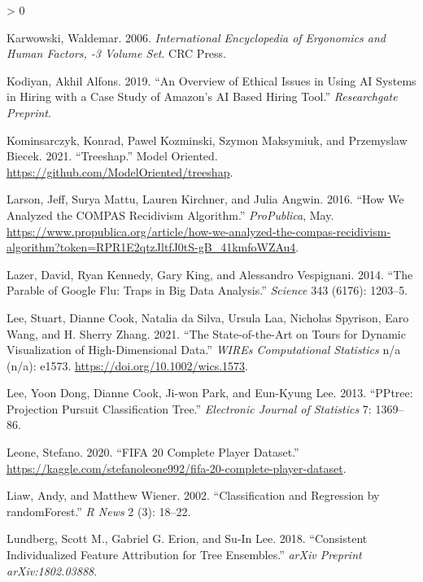\documentclass[
  article]{article}
\newlength{\cslhangindent}
\newenvironment{CSLReferences}[2] %
 {%
  \setlength{\parindent}{0pt}
  \ifodd #1 \everypar{\setlength{\hangindent}{\cslhangindent}}\ignorespaces\fi
  \ifnum #2 > 0
  \setlength{\parskip}{#2\baselineskip}
  \fi
 }%
 {}
\begin{document}
\begin{CSLReferences}{1}{0}
\leavevmode\hypertarget{ref-karwowski_international_2006}{}%
Karwowski, Waldemar. 2006. \emph{International {Encyclopedia} of {Ergonomics} and {Human} {Factors}, -3 {Volume} {Set}}. CRC Press.

\leavevmode\hypertarget{ref-kodiyan_overview_2019}{}%
Kodiyan, Akhil Alfons. 2019. {``An Overview of Ethical Issues in Using {AI} Systems in Hiring with a Case Study of {Amazon}'s {AI} Based Hiring Tool.''} \emph{Researchgate Preprint}.

\leavevmode\hypertarget{ref-kominsarczyk_treeshap_2021}{}%
Kominsarczyk, Konrad, Pawel Kozminski, Szymon Maksymiuk, and Przemyslaw Biecek. 2021. {``Treeshap.''} Model Oriented. \url{https://github.com/ModelOriented/treeshap}.

\leavevmode\hypertarget{ref-larson_how_2016}{}%
Larson, Jeff, Surya Mattu, Lauren Kirchner, and Julia Angwin. 2016. {``How {We} {Analyzed} the {COMPAS} {Recidivism} {Algorithm}.''} \emph{ProPublica}, May. \url{https://www.propublica.org/article/how-we-analyzed-the-compas-recidivism-algorithm?token=RPR1E2qtzJltfJ0tS-gB_41kmfoWZAu4}.

\leavevmode\hypertarget{ref-lazer_parable_2014}{}%
Lazer, David, Ryan Kennedy, Gary King, and Alessandro Vespignani. 2014. {``The Parable of {Google} {Flu}: Traps in Big Data Analysis.''} \emph{Science} 343 (6176): 1203--5.

\leavevmode\hypertarget{ref-lee_state_2021}{}%
Lee, Stuart, Dianne Cook, Natalia da Silva, Ursula Laa, Nicholas Spyrison, Earo Wang, and H. Sherry Zhang. 2021. {``The State-of-the-Art on Tours for Dynamic Visualization of High-Dimensional Data.''} \emph{WIREs Computational Statistics} n/a (n/a): e1573. \url{https://doi.org/10.1002/wics.1573}.

\leavevmode\hypertarget{ref-lee_pptree_2013}{}%
Lee, Yoon Dong, Dianne Cook, Ji-won Park, and Eun-Kyung Lee. 2013. {``{PPtree}: {Projection} Pursuit Classification Tree.''} \emph{Electronic Journal of Statistics} 7: 1369--86.

\leavevmode\hypertarget{ref-leone_fifa_2020}{}%
Leone, Stefano. 2020. {``{FIFA} 20 Complete Player Dataset.''} \url{https://kaggle.com/stefanoleone992/fifa-20-complete-player-dataset}.

\leavevmode\hypertarget{ref-liaw_classification_2002}{}%
Liaw, Andy, and Matthew Wiener. 2002. {``Classification and Regression by {randomForest}.''} \emph{R News} 2 (3): 18--22.

\leavevmode\hypertarget{ref-lundberg_consistent_2018}{}%
Lundberg, Scott M., Gabriel G. Erion, and Su-In Lee. 2018. {``Consistent Individualized Feature Attribution for Tree Ensembles.''} \emph{arXiv Preprint arXiv:1802.03888}.


\end{CSLReferences}
\end{document}
